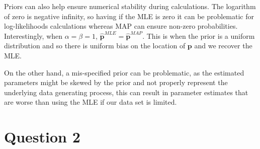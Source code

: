 \documentclass[12pt]{article}
\begin{document}
\begin{enumerate}
Priors can also help ensure numerical stability during calculations.
The logarithm of zero is negative infinity, so having if the MLE is zero it can be problematic for log-likelihoods calculations whereas MAP can ensure non-zero probabilities.
Interestingly, when $\alpha=\beta=1$, $\hat{\textbf{p}}^{MLE} = \hat{\textbf{p}}^{MAP}$.
This is when the prior is a uniform distribution and so there is uniform bias on the location of $\textbf{p}$ and we recover the MLE.

On the other hand, a mis-specified prior can be problematic, as the estimated parameters might be skewed by the prior and not properly represent the underlying data generating process, this can result in parameter estimates that are worse than using the MLE if our data set is limited.







\end{enumerate}

\newpage
\section*{Question 2}
\end{document}

